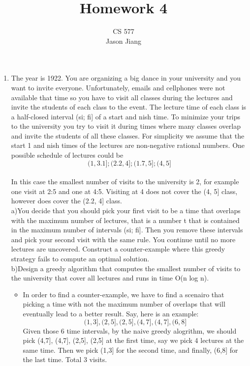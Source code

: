 \documentclass{article}
\author{CS 577\\Jason Jiang}
\title{Homework 4}
\begin{document}
    \maketitle
    \begin{enumerate}
        \item   The year is 1922. You are organizing a big dance in your university and you want to invite everyone. Unfortunately, emails and cellphones were not available that time so you have to visit all classes during the lectures and invite the students of each class to the event. The lecture time of each class is a half-closed interval (si; fi] of a start and  nish time. To minimize your trips to the university you try to visit it during times where many classes overlap and invite the students of all these classes. For simplicity we assume that the start 1 and  nish times of the lectures are non-negative rational numbers. One possible schedule of lectures could be
            \\
            $$(1, 3.1]; (2.2, 4]; (1.7, 5]; (4, 5]$$\\
            In this case the smallest number of visits to the university is 2, for example one visit at 2:5
            and one at 4:5. Visiting at 4 does not cover the (4, 5] class, however does cover the (2.2, 4]
            class.\\
            a)You decide that you should pick your first visit to be a time that overlaps with the
            maximum number of lectures, that is a number t that is contained in the maximum
            number of intervals (si; fi]. Then you remove these intervals and pick your second visit
            with the same rule. You continue until no more lectures are uncovered. Construct a
            counter-example where this greedy strategy fails to compute an optimal solution.\\
            b)Design a greedy algorithm that computes the smallest number of visits to the university
            that cover all lectures and runs in time O(n log n).\\
            \begin{itemize}
                \item
                    In order to find a counter-example, we have to find a scenairo that picking a time with not the maximum number of overlaps that will eventually lead to a better result. Say, here is an example: \\
                    $$(1,3],(2,5],(2,5],(4,7],(4,7],(6,8] $$
                    Given those 6 time intervals, by the naive greedy alogrithm, we should pick (4,7], (4,7], (2,5], (2,5] at the first time, say we pick 4 lectures at the same time. Then we pick (1,3] for the second time, and finally, (6,8] for the last time. Total 3 visits. \\

\end{itemize}
\end{enumerate}
\end{document}
